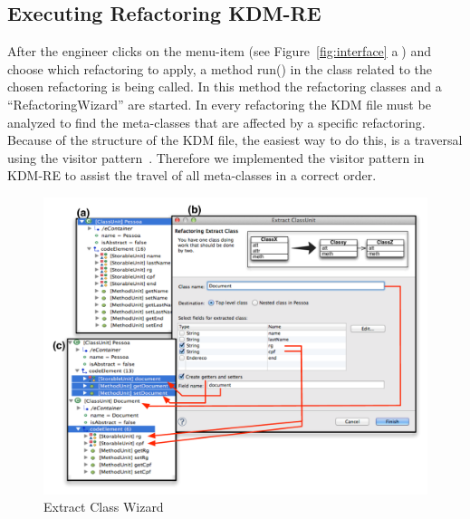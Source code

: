 \subsection{Executing Refactoring KDM-RE}

After the engineer clicks on the menu-item (see Figure~\ref{fig:interface} \textcircled{a}) and choose which refactoring to apply, a method run() in the class related to the chosen refactoring is being called. In this method the refactoring classes and a ``RefactoringWizard'' are started. In every refactoring the KDM file must be analyzed to find the meta-classes that are affected by a specific refactoring. Because of the structure of the KDM file, the easiest way to do this, is a traversal using the visitor pattern~\cite{gamma}. Therefore we implemented the visitor pattern in KDM-RE to assist the travel of all meta-classes in a correct order.

\begin{figure}[!ht]
\centering
  \includegraphics[scale=0.6]{figure/Wizard2}
\caption{Extract Class Wizard}
\label{fig:wizard}
\end{figure}

